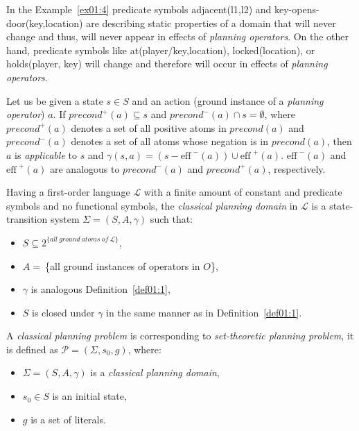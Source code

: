 \medskip\noindent
In the Example~\ref{ex01:4} predicate symbols adjacent(l1,l2) and key-opens-door(key,location) are describing static properties of a domain that will never change and thus, will never appear in effects of \emph{planning operators}. On the other hand, predicate symbols like at(player/key,location), locked(location), or holds(player, key) will change and therefore will occur in effects of \emph{planning operators}.

\begin{defn}\label{def01:6}
Let us be given a state $s \in S$ and an action (ground instance of a \emph{planning operator}) $a$. If $precond^{+}(a) \subseteq s$ and $precond^{-}(a) \cap s = \emptyset$, where $precond^{+}(a)$ denotes a set of all positive atoms in $precond(a)$ and $precond^{-}(a)$ denotes a set of all atoms whose negation is in $precond(a)$, then $a$ is \emph{applicable} to $s$ and $\gamma(s,a)=(s-\text{eff}^{\,\,-}(a)) \cup \text{eff}^{\,\,+}(a)$. $\text{eff}^{\,\,-}(a)$ and $\text{eff}^{\,\,+}(a)$ are analogous to $precond^{-}(a)$ and $precond^{+}(a)$, respectively.
\end{defn}

\begin{defn}\label{def01:7}
Having a first-order language $\mathcal{L}$ with a finite amount of constant and predicate symbols and no functional symbols, the \emph{classical planning domain} in $\mathcal{L}$ is a state-transition system $\Sigma = (S,A,\gamma)$ such that:

    \begin{itemize}
        \item $S \subseteq 2^{\displaystyle \{all~ground~atoms~of~\mathcal{L}\}}$,
        \item $A =~$\{all ground instances of operators in $O$\},
        \item $\gamma$ is analogous Definition~\ref{def01:1},
        \item $S$ is closed under $\gamma$ in the same manner as in Definition~\ref{def01:1}.
    \end{itemize}
\end{defn}

\begin{defn}\label{def01:8}
A \emph{classical planning problem} is corresponding to \emph{set-theoretic planning problem}, it is defined as $\mathcal{P} = (\Sigma,s_0,g)$, where:

    \begin{itemize}
        \item $\Sigma = (S,A,\gamma)$ is a \emph{classical planning domain},
        \item $s_0 \in S$ is an initial state,
        \item $g$ is a set of literals.
    \end{itemize}
\end{defn}

